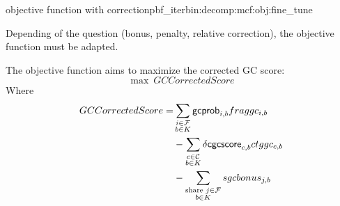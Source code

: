 \begin{definition}{\MGC{} objective function with correction}{pbf_iterbin:decomp:mcf:obj:fine_tune}
  \begin{fixmebox}
    Depending of the question (bonus, penalty, relative correction), the objective function must be adapted.
  \end{fixmebox}
  The objective function aims to maximize the corrected GC score:
  \begin{equation}
    \max ~ GCCorrectedScore
  \end{equation}
  Where
  \begin{align}
    \begin{split}
      GCCorrectedScore = & \sum_{\substack{
          i \in \mathcal{F}{} \\
          b \in K
      }} \mathsf{gcprob}_{i, b} fraggc_{i, b} \\
      & - \sum_{\substack{
          c \in \mathcal{C}{} \\
          b \in K
      }} \mathsf{\delta cgcscore}_{c, b}ctggc_{c,b} \\
      & - \sum_{\substack{
          \text{share } j \in \mathcal{F}{} \\
          b \in K
      }} sgcbonus_{j, b}
    \end{split}
  \end{align}
\end{definition}
